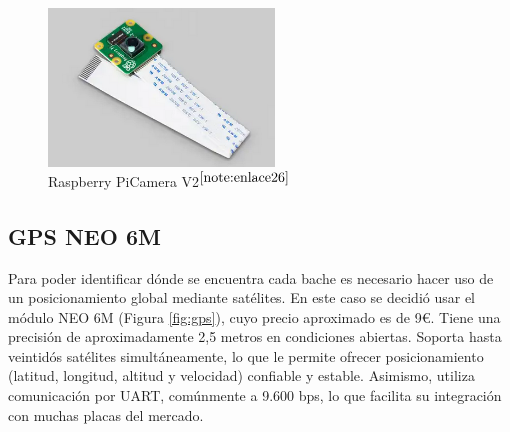 \begin{figure} [h!]
	\begin{center}
		\includegraphics[width=6cm]{figs/campi.png}
	\end{center}
	\caption{Raspberry PiCamera V2$^{\ref{note:enlace26}}$} 
\label{fig:raspberrycam}
\end{figure}

\setcounter{footnote}{26} %

\subsection{GPS NEO 6M}
\label{subsec:gps}

Para poder identificar dónde se encuentra cada bache es necesario hacer uso de un posicionamiento global mediante satélites. En este caso se decidió usar el módulo NEO 6M (Figura \ref{fig:gps}), cuyo precio aproximado es de 9€. Tiene una precisión de aproximadamente 2,5 metros en condiciones abiertas. Soporta hasta veintidós satélites simultáneamente, lo que le permite ofrecer posicionamiento (latitud, longitud, altitud y velocidad) confiable y estable. Asimismo, utiliza comunicación por \ac{UART}, comúnmente a 9.600 bps, lo que facilita su integración con muchas placas del mercado.



